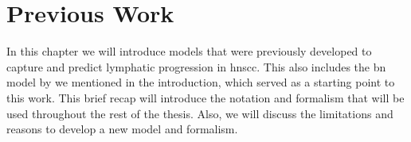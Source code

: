 \documentclass[\relativeRoot/main.tex]{subfiles}
\begin{document}
\chapter{Previous Work}
\label{chap:previous_work}

In this chapter we will introduce models that were previously developed to capture and predict lymphatic progression in \gls{hnscc}. This also includes the \gls{bn} model by  we mentioned in the introduction, which served as a starting point to this work. This brief recap will introduce the notation and formalism that will be used throughout the rest of the thesis. Also, we will discuss the limitations and reasons to develop a new model and formalism.



\end{document}
